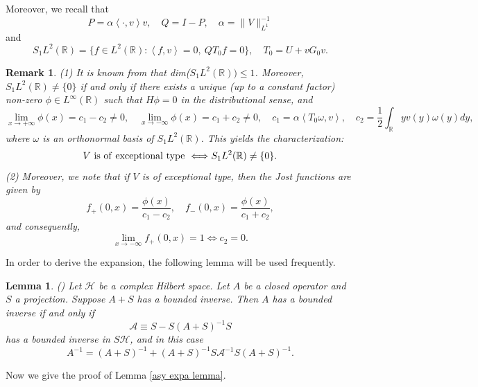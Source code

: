 \documentclass[reqno]{amsart}
\newtheorem{lemma}[definition]{Lemma}
\newtheorem{remark}[definition]{Remark}
\newcommand\R{\mathbb{R}}
\newcommand\mcaA{\mathcal{A}}
\newcommand\mscH{\mathscr{H}}
\numberwithin{equation}{section}
\begin{document}
Moreover, we recall that
$$P=\alpha\left<\cdot,v\right>v,\quad Q=I-P,\quad \alpha=\|V\|^{-1}_{L^1}$$
and 
$$S_1L^2(\R)=\{f\in L^2(\R):\left<f,v\right>=0,\ QT_0f=0\},\quad T_0=U+vG_0v.$$
\begin{remark}\label{rema of S1 and rela betwe c2 and lim}
{\rm (1) It is known from \cite[Lemma 5.4]{JN01} that dim($S_1L^2(\R))\leq1$. Moreover, $S_1L^2(\R)\neq\{0\}$ if and only if there exists a unique (up to a constant factor) non-zero $\phi\in L^{\infty}(\R)$ such that $H\phi=0$ in the distributional sense, and 
\begin{equation*}
\lim\limits_{x\rightarrow+\infty}\phi(x)=c_1-c_2\neq0,\quad \lim\limits_{x\rightarrow-\infty}\phi(x)=c_1+c_2\neq0,\quad c_1=\alpha\left<T_0\omega,v\right>,\quad c_2=\frac{1}{2}\int_{\R}yv(y)\omega(y)dy,
\end{equation*}
where $\omega$ is an orthonormal basis of $S_1L^2(\R)$. This yields the characterization:
$$V\  {\rm is\  of\  exceptional\  type}\   \Longleftrightarrow S_1L^2(\R)\neq\{0\}.$$ 
(2) Moreover, we note that if $V$ is of exceptional type, then the Jost functions are given by
 $$f_{+}(0,x)=\frac{\phi(x)}{c_1-c_2},\quad f_-(0,x)=\frac{\phi(x)}{c_1+c_2},$$
and consequently,
 \begin{equation*}
\lim\limits_{x\rightarrow-\infty}f_{+}(0,x)=1\Longleftrightarrow c_2=0.
 \end{equation*}
}   
\end{remark}
In order to derive the expansion, the following lemma will be used frequently.
\begin{lemma}\label{lemm of inverse}
{\rm (\cite[Lemma 2.1]{JN01})} Let $\mscH$ be a complex Hilbert space. Let $A$ be a closed operator and $S$ a projection. Suppose $A+S$ has a bounded inverse. Then $A$ has a bounded inverse if and only if
$$\mcaA\equiv S-S(A+S)^{-1}S$$
has a bounded inverse in $S\mscH$, and in this case
$$A^{-1}=(A+S)^{-1}+(A+S)^{-1}S \mcaA^{-1}S(A+S)^{-1}.$$
\end{lemma}
Now we give the proof of Lemma \ref{asy expa lemma}.
\end{document}
